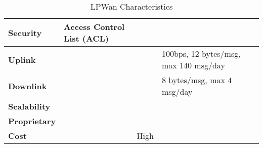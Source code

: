 \begin{table}[h!]
\begin{tabulary}{\textwidth}{L|L|L|L|L}
	\bf{Security}                                  & Access Control List (ACL) &                                 &                                       &               \\\hline
	\bf{Uplink}                                    &                           &                                 & 100bps, 12 bytes/msg, max 140 msg/day &               \\\hline
	\bf{Downlink}                                  &                           &                                 & 8 bytes/msg, max 4 msg/day            &               \\\hline
	\bf{Scalability}                               &                           &                                 &                                       &               \\\hline
	\bf{Proprietary}                               &                           &                                 & \ok                                   &               \\\hline
	\bf{Cost}                                      &                           & High                            &                                       &               \\\hline
	
	\end{tabulary}
	\caption{\label{tab:LPWan_characteristics} LPWan Characteristics \cite{al-kashoash_comparison_2016}}
\end{table}
